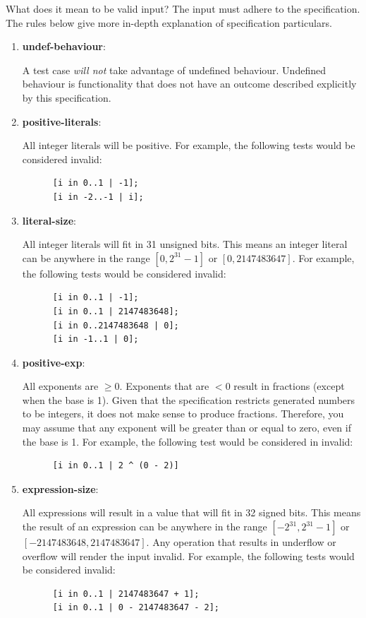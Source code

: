 \documentclass{article}
\newcommand{\assertiondest}[1]{\hypertarget{#1}{\textbf{#1}:}}
\begin{document}
What does it mean to be valid input? The input must adhere to the specification. The rules below
give more in-depth explanation of specification particulars.
\begin{enumerate}
  \item
    \assertiondest{undef-behaviour}
    A test case \textit{will not} take advantage of undefined behaviour. Undefined behaviour is
    functionality that does not have an outcome described explicitly by this specification.
  \item
    \assertiondest{positive-literals}
    All integer literals will be positive. For example, the following tests would be considered
    invalid:
    \begin{lstlisting}
      [i in 0..1 | -1];
      [i in -2..-1 | i];
    \end{lstlisting}
  \item
    \assertiondest{literal-size}
    All integer literals will fit in 31 unsigned bits. This means an integer literal can be
    anywhere in the range $[0, 2^{31} - 1]$ or $[0, 2147483647]$. For example, the following tests
    would be considered invalid:
    \begin{lstlisting}
      [i in 0..1 | -1];
      [i in 0..1 | 2147483648];
      [i in 0..2147483648 | 0];
      [i in -1..1 | 0];
    \end{lstlisting}
  \item
    \assertiondest{positive-exp}
    All exponents are $\geq 0$. Exponents that are $< 0$ result in fractions (except when the
    base is 1). Given that the specification restricts generated numbers to be integers,  it does
    not make sense to produce fractions. Therefore, you may assume that any exponent will be
    greater than or equal to zero, even if the base is 1. For example, the following test would be
    considered in invalid:
    \begin{lstlisting}
      [i in 0..1 | 2 ^ (0 - 2)]
    \end{lstlisting}
  \item
    \assertiondest{expression-size}
    All expressions will result in a value that will fit in 32 signed bits. This means the result
    of an expression can be anywhere in the range $[-2^{31}, 2^{31} - 1]$ or $[-2147483648,
    2147483647]$. Any operation that results in underflow or overflow will render the input
    invalid. For example, the following tests would be considered invalid:
    \begin{lstlisting}
      [i in 0..1 | 2147483647 + 1];
      [i in 0..1 | 0 - 2147483647 - 2];

\end{lstlisting}
\end{enumerate}
\end{document}
